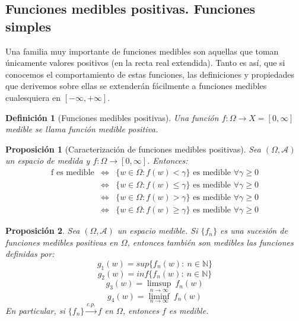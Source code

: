 \documentclass[11pt, a4paper]{article}
\newcommand{\fn}{\{f_n\}}
\theoremstyle{theorem-style}
\newtheorem{nprop}{Proposición}[section]
\theoremstyle{definition-style}
\newtheorem{ndef}{Definición}[section]
\theoremstyle{remark-style}
\theoremstyle{example-style}
\begin{document}
\subsection{Funciones medibles positivas. Funciones simples}

Una familia muy importante de funciones medibles son aquellas que toman únicamente valores positivos (en la recta real extendida). Tanto es así, que si conocemos el comportamiento de estas funciones, las definiciones y propiedades que derivemos sobre ellas se extenderán fácilmente a funciones medibles cualesquiera en $[-\infty,+\infty]$.

\begin{ndef}[Funciones medibles positivas]
  Una función $f: \Omega \to X = [0,\infty ]$ medible se llama función medible positiva.
\end{ndef}


\begin{nprop}[Caracterización de funciones medibles positivas]
  Sea $(\Omega,\mathcal{A})$ un espacio de medida y $f:\Omega \to [0,\infty]$. Entonces:
  \[
  \begin{array}{lll}
    \text{f es medible} & \iff & \{w \in \Omega : f(w) < \gamma \} \text{ es medible } \forall \gamma \geq 0\\

    & \iff & \{w \in \Omega : f(w) \leq \gamma \} \text{ es medible } \forall \gamma \geq 0\\

    & \iff & \{w \in \Omega : f(w) > \gamma \} \text{ es medible } \forall \gamma \geq 0\\

    & \iff & \{w \in \Omega : f(w) \geq \gamma \} \text{ es medible } \forall \gamma \geq 0
    \end{array}
  \]
\end{nprop}

\begin{nprop} \label {p1}
  Sea $(\Omega,\mathcal{A})$ un espacio medible. Si $\{f_n\}$ es una sucesión de funciones medibles positivas en $\Omega$, entonces también son medibles las funciones definidas por:
  \[
    g_1(w) =  sup\{f_n(w) : \ n \in \mathbb{N} \}
  \]
  \[
    g_2(w) =  inf\{f_n(w) : \ n \in \mathbb{N} \}
  \]
  \[
    g_3(w) = \limsup_{n\to \infty} \ f_n(w)
  \]
  \[
    g_4(w) = \liminf_{n\to \infty}  \ f_n(w)
  \]
  En particular, si $\fn \xrightarrow{c.p.} f$ en $\Omega$, entonces $f$ es medible.
\end{nprop}
\end{document}
